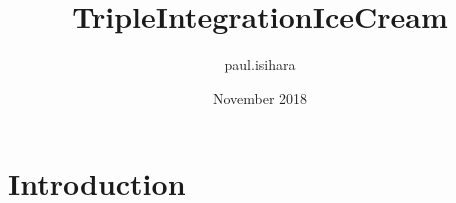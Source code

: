 \documentclass{article}
\title{TripleIntegrationIceCream}
\author{paul.isihara }
\date{November 2018}
\begin{document}
\maketitle

\section{Introduction}
\end{document}
